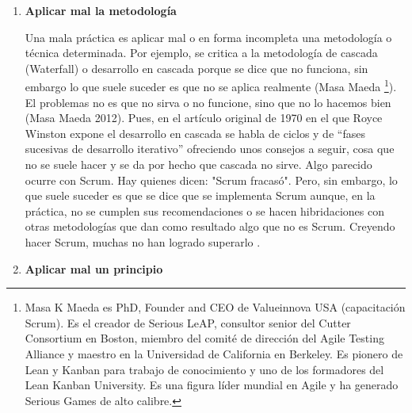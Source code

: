 \begin{enumerate}

\item \textbf{Aplicar mal la metodología}

Una mala práctica es aplicar mal o en forma incompleta una metodología o técnica determinada. Por ejemplo, se critica a la metodología de cascada (Waterfall) o desarrollo en cascada porque se dice que no funciona, sin embargo lo que suele suceder es que no se aplica realmente (Masa Maeda \footnote{Masa K Maeda es PhD, Founder and CEO de Valueinnova USA (capacitación Scrum). Es el creador de Serious LeAP, consultor senior del Cutter Consortium en Boston, miembro del comité de dirección del Agile Testing Alliance y maestro en la Universidad de California en Berkeley. Es pionero de Lean y Kanban para trabajo de conocimiento y uno de los formadores del Lean Kanban University. Es una figura líder mundial en Agile y ha generado Serious Games de alto calibre.}). El problemas no es que no sirva o no funcione, sino que no lo hacemos bien (Masa Maeda  2012). Pues, en el artículo original de 1970 en el que Royce Winston expone el desarrollo en cascada se habla de ciclos y de “fases sucesivas de desarrollo iterativo” \cite{Winston-Royce-1970} ofreciendo unos consejos a seguir, cosa que no se suele hacer y se da por hecho que cascada no sirve. Algo parecido ocurre con Scrum. Hay quienes dicen:  "Scrum fracasó". Pero, sin embargo, lo que suele suceder es que se dice que se implementa Scrum aunque, en la práctica, no se cumplen sus recomendaciones o se hacen hibridaciones con otras metodologías que dan como resultado algo que no es Scrum. Creyendo hacer Scrum, muchas no han logrado superarlo \cite{Gantthead-James-2010}. 

\item \textbf{Aplicar mal un principio}


\end{enumerate}
